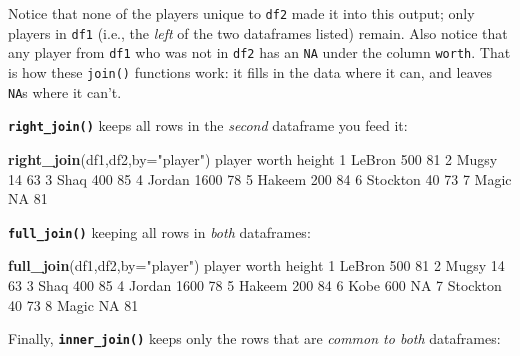\documentclass[]{book}
\newenvironment{Shaded}{\begin{snugshade}}{\end{snugshade}}
\newcommand{\DataTypeTok}[1]{\textcolor[rgb]{0.13,0.29,0.53}{#1}}
\newcommand{\DecValTok}[1]{\textcolor[rgb]{0.00,0.00,0.81}{#1}}
\newcommand{\KeywordTok}[1]{\textcolor[rgb]{0.13,0.29,0.53}{\textbf{#1}}}
\newcommand{\NormalTok}[1]{#1}
\newcommand{\OtherTok}[1]{\textcolor[rgb]{0.56,0.35,0.01}{#1}}
\newcommand{\StringTok}[1]{\textcolor[rgb]{0.31,0.60,0.02}{#1}}
\begin{document}
Notice that none of the players unique to \texttt{df2} made it into this output; only players in \texttt{df1} (i.e., the \emph{left} of the two dataframes listed) remain. Also notice that any player from \texttt{df1} who was not in \texttt{df2} has an \texttt{NA} under the column \texttt{worth}. That is how these \texttt{join()} functions work: it fills in the data where it can, and leaves \texttt{NA}s where it can't.

\textbf{\texttt{right\_join()}} keeps all rows in the \emph{second} dataframe you feed it:

\begin{Shaded}
\begin{Highlighting}[]
\KeywordTok{right_join}\NormalTok{(df1,df2,}\DataTypeTok{by=}\StringTok{"player"}\NormalTok{)}
\NormalTok{    player worth height}
\DecValTok{1}\NormalTok{   LeBron   }\DecValTok{500}     \DecValTok{81}
\DecValTok{2}\NormalTok{    Mugsy    }\DecValTok{14}     \DecValTok{63}
\DecValTok{3}\NormalTok{     Shaq   }\DecValTok{400}     \DecValTok{85}
\DecValTok{4}\NormalTok{   Jordan  }\DecValTok{1600}     \DecValTok{78}
\DecValTok{5}\NormalTok{   Hakeem   }\DecValTok{200}     \DecValTok{84}
\DecValTok{6}\NormalTok{ Stockton    }\DecValTok{40}     \DecValTok{73}
\DecValTok{7}\NormalTok{    Magic    }\OtherTok{NA}     \DecValTok{81}
\end{Highlighting}
\end{Shaded}

\textbf{\texttt{full\_join()}} keeping all rows in \emph{both} dataframes:

\begin{Shaded}
\begin{Highlighting}[]
\KeywordTok{full_join}\NormalTok{(df1,df2,}\DataTypeTok{by=}\StringTok{"player"}\NormalTok{)}
\NormalTok{    player worth height}
\DecValTok{1}\NormalTok{   LeBron   }\DecValTok{500}     \DecValTok{81}
\DecValTok{2}\NormalTok{    Mugsy    }\DecValTok{14}     \DecValTok{63}
\DecValTok{3}\NormalTok{     Shaq   }\DecValTok{400}     \DecValTok{85}
\DecValTok{4}\NormalTok{   Jordan  }\DecValTok{1600}     \DecValTok{78}
\DecValTok{5}\NormalTok{   Hakeem   }\DecValTok{200}     \DecValTok{84}
\DecValTok{6}\NormalTok{     Kobe   }\DecValTok{600}     \OtherTok{NA}
\DecValTok{7}\NormalTok{ Stockton    }\DecValTok{40}     \DecValTok{73}
\DecValTok{8}\NormalTok{    Magic    }\OtherTok{NA}     \DecValTok{81}
\end{Highlighting}
\end{Shaded}

Finally, \textbf{\texttt{inner\_join()}} keeps only the rows that are \emph{common to both} dataframes:
\end{document}
